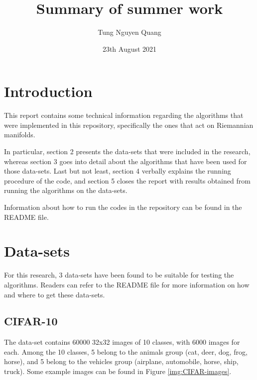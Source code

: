 \documentclass[12pt]{article}
\title{Summary of summer work}
\author{Tung Nguyen Quang}
\date{23th August 2021}
\begin{document}
\maketitle
\begin{sloppypar}

\section{Introduction}
This report contains some technical information regarding the algorithms that were implemented in this repository, specifically the ones that act on Riemannian manifolds. 

\noindent
In particular, section 2 presents the data-sets that were included in the research, whereas section 3 goes into detail about the algorithms that have been used for those data-sets. Last but not least, section 4 verbally explains the running procedure of the code, and section 5 closes the report with results obtained from running the algorithms on the data-sets.

\noindent
Information about how to run the codes in the repository can be found in the README file.


\section{Data-sets}
For this research, 3 data-sets have been found to be suitable for testing the algorithms. Readers can refer to the README file for more information on how and where to get these data-sets.

\subsection{CIFAR-10}
The data-set contains 60000 32x32 images of 10 classes, with 6000 images for each. Among the 10 classes, 5 belong to the animals group (cat, deer, dog, frog, horse), and 5 belong to the vehicles group (airplane, automobile, horse, ship, truck). Some example images can be found in Figure \ref{img:CIFAR-images}.


\end{sloppypar}
\end{document}
